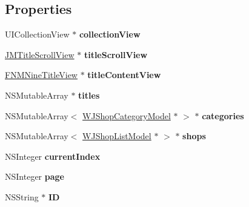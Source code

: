 \subsection*{Properties}
\begin{DoxyCompactItemize}
\item 
\mbox{\label{category_j_d_rebate_view_controller_07_08_af5c9dbe9d2dc7a78893a1acb1f669063}} 
U\+I\+Collection\+View $\ast$ {\bfseries collection\+View}
\item 
\mbox{\label{category_j_d_rebate_view_controller_07_08_ab4c158f39ccdb04cde82d672bd1d2e6b}} 
\mbox{\hyperlink{interface_j_m_title_scroll_view}{J\+M\+Title\+Scroll\+View}} $\ast$ {\bfseries title\+Scroll\+View}
\item 
\mbox{\label{category_j_d_rebate_view_controller_07_08_ab230dfd843997aa4a6dfbddac03dd2f9}} 
\mbox{\hyperlink{interface_f_n_m_nine_title_view}{F\+N\+M\+Nine\+Title\+View}} $\ast$ {\bfseries title\+Content\+View}
\item 
\mbox{\label{category_j_d_rebate_view_controller_07_08_ab1e946a7fa3d3c4c0baf0b7aa24b2b8e}} 
N\+S\+Mutable\+Array $\ast$ {\bfseries titles}
\item 
\mbox{\label{category_j_d_rebate_view_controller_07_08_aaab07a391679bdd902dd78e3fa24c4f0}} 
N\+S\+Mutable\+Array$<$ \mbox{\hyperlink{interface_w_j_shop_category_model}{W\+J\+Shop\+Category\+Model}} $\ast$ $>$ $\ast$ {\bfseries categories}
\item 
\mbox{\label{category_j_d_rebate_view_controller_07_08_a4ee85e7b0f63ca762c07c8bc59c95d5a}} 
N\+S\+Mutable\+Array$<$ \mbox{\hyperlink{interface_w_j_shop_list_model}{W\+J\+Shop\+List\+Model}} $\ast$ $>$ $\ast$ {\bfseries shops}
\item 
\mbox{\label{category_j_d_rebate_view_controller_07_08_a78c3de3e9ee013c338815d5a5ad817ed}} 
N\+S\+Integer {\bfseries current\+Index}
\item 
\mbox{\label{category_j_d_rebate_view_controller_07_08_acba40f1691df55f9b2a279e729009e5b}} 
N\+S\+Integer {\bfseries page}
\item 
\mbox{\label{category_j_d_rebate_view_controller_07_08_a3baa875e2fdf43ea9f95004903a3d05b}} 
N\+S\+String $\ast$ {\bfseries ID}
\end{DoxyCompactItemize}


